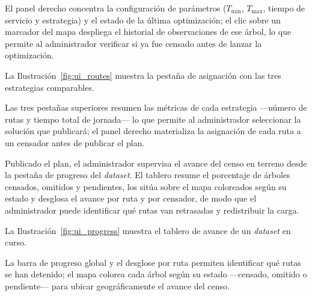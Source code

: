 
El panel derecho concentra la configuración de parámetros ($T_{\min}$, $T_{\max}$, tiempo de servicio y estrategia) y el estado de la última optimización; el clic sobre un marcador del mapa despliega el historial de observaciones de ese árbol, lo que permite al administrador verificar si ya fue censado antes de lanzar la optimización.

La Ilustración~\ref{fig:ui_routes} muestra la pestaña de asignación con las tres estrategias comparables.


Las tres pestañas superiores resumen las métricas de cada estrategia ---número de rutas y tiempo total de jornada--- lo que permite al administrador seleccionar la solución que publicará; el panel derecho materializa la asignación de cada ruta a un censador antes de publicar el plan.

Publicado el plan, el administrador supervisa el avance del censo en terreno desde
la pestaña de progreso del \textit{dataset}. El tablero resume el porcentaje de
árboles censados, omitidos y pendientes, los sitúa sobre el mapa coloreados según su
estado y desglosa el avance por ruta y por censador, de modo que el administrador
puede identificar qué rutas van retrasadas y redistribuir la carga.

La Ilustración~\ref{fig:ui_progress} muestra el tablero de avance de un \textit{dataset} en curso.


La barra de progreso global y el desglose por ruta permiten identificar qué rutas se han detenido; el mapa colorea cada árbol según su estado ---censado, omitido o pendiente--- para ubicar geográficamente el avance del censo.

